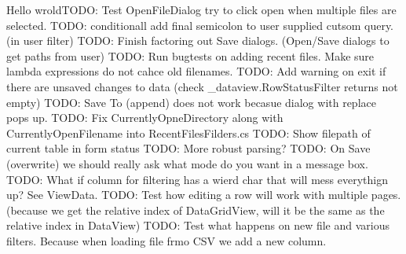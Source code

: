 Hello wrold\+T\+O\+D\+O\+: Test Open\+File\+Dialog try to click open when multiple files are selected. T\+O\+D\+O\+: conditionall add final semicolon to user supplied cutsom query. (in user filter) T\+O\+D\+O\+: Finish factoring out Save dialogs. (Open/\+Save dialogs to get paths from user) T\+O\+D\+O\+: Run bugtests on adding recent files. Make sure lambda expressions do not cahce old filenames. T\+O\+D\+O\+: Add warning on exit if there are unsaved changes to data (check \+\_\+dataview.\+Row\+Status\+Filter returns not empty) T\+O\+D\+O\+: Save To (append) does not work becasue dialog with replace pops up. T\+O\+D\+O\+: Fix Currently\+Opne\+Directory along with Currently\+Open\+Filename into Recent\+Files\+Filders.\+cs T\+O\+D\+O\+: Show filepath of current table in form status T\+O\+D\+O\+: More robust parsing? T\+O\+D\+O\+: On Save (overwrite) we should really ask what mode do you want in a message box. T\+O\+D\+O\+: What if column for filtering has a wierd char that will mess everythign up? See View\+Data. T\+O\+D\+O\+: Test how editing a row will work with multiple pages. (because we get the relative index of Data\+Grid\+View, will it be the same as the relative index in Data\+View) T\+O\+D\+O\+: Test what happens on new file and various filters. Because when loading file frmo C\+S\+V we add a new column. 